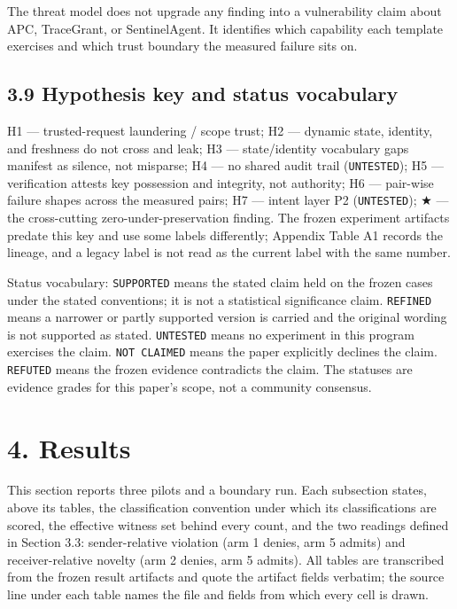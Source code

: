 \documentclass[
  10pt,
]{article}
\let\origtexttt\texttt
\renewcommand{\texttt}[1]{{\upshape\origtexttt{#1}}}
\renewcommand{\_}{\allowbreak\origunderscore}
\begin{document}
The threat model does not upgrade any finding into a vulnerability claim
about APC, TraceGrant, or SentinelAgent. It identifies which capability
each template exercises and which trust boundary the measured failure
sits on.

\subsection{3.9 Hypothesis key and status
vocabulary}\label{hypothesis-key-and-status-vocabulary}

H1 --- trusted-request laundering / scope trust; H2 --- dynamic state,
identity, and freshness do not cross and leak; H3 --- state/identity
vocabulary gaps manifest as silence, not misparse; H4 --- no shared
audit trail (\texttt{UNTESTED}); H5 --- verification attests key
possession and integrity, not authority; H6 --- pair-wise failure shapes
across the measured pairs; H7 --- intent layer P2 (\texttt{UNTESTED}); ★
--- the cross-cutting zero-under-preservation finding. The frozen
experiment artifacts predate this key and use some labels differently;
Appendix Table A1 records the lineage, and a legacy label is not read as
the current label with the same number.

Status vocabulary: \texttt{SUPPORTED} means the stated claim held on the
frozen cases under the stated conventions; it is not a statistical
significance claim. \texttt{REFINED} means a narrower or partly
supported version is carried and the original wording is not supported
as stated. \texttt{UNTESTED} means no experiment in this program
exercises the claim. \texttt{NOT\ CLAIMED} means the paper explicitly
declines the claim. \texttt{REFUTED} means the frozen evidence
contradicts the claim. The statuses are evidence grades for this paper's
scope, not a community consensus.

\section{4. Results}\label{results}

This section reports three pilots and a boundary run. Each subsection
states, above its tables, the classification convention under which its
classifications are scored, the effective witness set behind every
count, and the two readings defined in Section 3.3: sender-relative
violation (arm 1 denies, arm 5 admits) and receiver-relative novelty
(arm 2 denies, arm 5 admits). All tables are transcribed from the frozen
result artifacts and quote the artifact fields verbatim; the source line
under each table names the file and fields from which every cell is
drawn.
\end{document}
